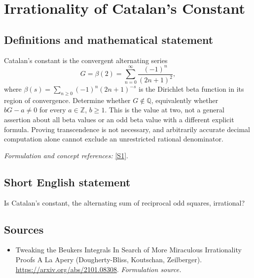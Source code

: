 \documentclass[11pt]{article}
\begin{document}
\section*{\texorpdfstring{Irrationality of Catalan’s Constant}{Irrationality of Catalan’s Constant}}\label{statement}
\subsection{Definitions and mathematical statement}
Catalan's constant is the convergent alternating series
\[
 G=\beta(2)=\sum_{n=0}^{\infty}\frac{(-1)^n}{(2n+1)^2},
\]
where $\beta(s)=\sum_{n\ge0}(-1)^n(2n+1)^{-s}$ is the Dirichlet beta function in its region of convergence. Determine whether $G\notin{\mathbb{Q}}$, equivalently whether $bG-a\ne0$ for every $a\in{\mathbb{Z}}$, $b\ge1$. This is the value at two, not a general assertion about all beta values or an odd beta value with a different explicit formula. Proving transcendence is not necessary, and arbitrarily accurate decimal computation alone cannot exclude an unrestricted rational denominator.
\par\smallskip\textit{Formulation and concept references:} \href{https://arxiv.org/abs/2101.08308}{[S1]}.

\subsection{Short English statement}
Is Catalan's constant, the alternating sum of reciprocal odd squares, irrational?
\subsection{Sources}
\begin{itemize}
\item[S1]Tweaking the Beukers Integrals In Search of More Miraculous Irrationality Proofs A La Apery (Dougherty-Bliss, Koutschan, Zeilberger).
\url{https://arxiv.org/abs/2101.08308}.
\textit{Formulation source.}
\end{itemize}
\end{document}
